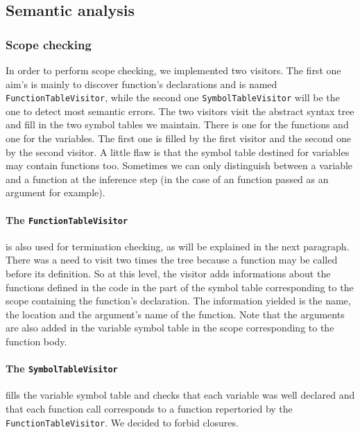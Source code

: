 \documentclass[a4paper,11pt]{article}
\begin{document}
\subsection{Semantic analysis}
\subsubsection{Scope checking}
In order to perform scope checking, we implemented two visitors. The first one aim's is mainly to discover function's declarations and is named \texttt{FunctionTableVisitor}, while the second one \texttt{SymbolTableVisitor} will be the one to detect most semantic errors. The two visitors visit the abstract syntax tree and fill in the two symbol tables we maintain. There is one for the functions and one for the variables. The first one is filled by the first visitor and the second one by the second visitor. A little flaw is that the symbol table destined for variables may contain functions too. Sometimes we can only distinguish between a variable and a function at the inference step (in the case of an function passed as an argument for example).
\paragraph{The \texttt{FunctionTableVisitor}} is also used for termination checking, as will be explained in the next paragraph. There was a need to visit two times the tree because a function may be called before its definition. So at this level, the visitor adds informations about the functions defined in the code in the part of the symbol table corresponding to the scope containing the function's declaration. The information yielded is the name, the location and the argument's name of the function. Note that the arguments are also added in the variable symbol table in the scope corresponding to the function body.

\paragraph{The \texttt{SymbolTableVisitor}} fills the variable symbol table and checks that each variable was well declared and that each function call corresponds to a function repertoried by the \texttt{FunctionTableVisitor}. We decided to forbid closures.  
\end{document}
